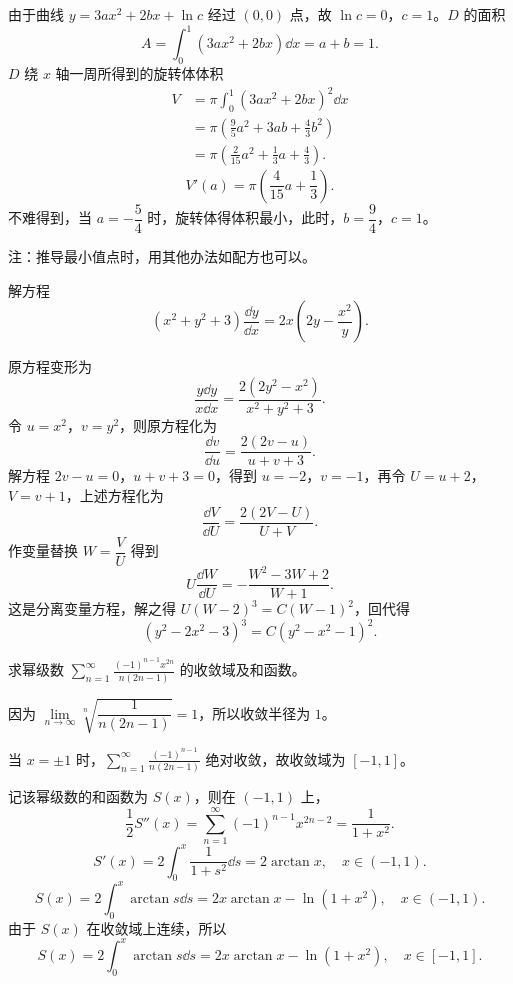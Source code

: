 \begin{solution}
由于曲线 $y=3ax^2+2bx+\ln c$ 经过 $(0,0)$ 点，故 $\ln c=0$，$c=1$。$D$ 的面积
\[ A=\int_0^1(3ax^2+2bx)\dd x=a+b=1. \]
$D$ 绕 $x$ 轴一周所得到的旋转体体积
\begin{align*}
V &= \pi\int_0^1(3ax^2+2bx)^2\dd x\\
&= \pi\left(\frac{9}{5}a^2+3ab+\frac{4}{3}b^2\right)\\
&= \pi\left(\frac{2}{15}a^2+\frac{1}{3}a+\frac{4}{3}\right).
\end{align*}
\[ V'(a)=\pi\left(\frac{4}{15}a+\frac{1}{3}\right). \]
不难得到，当 $a=-\dfrac{5}{4}$ 时，旋转体得体积最小，此时，$b=\dfrac{9}{4}$，$c=1$。

注：推导最小值点时，用其他办法如配方也可以。
\end{solution}

解方程
\[ (x^2+y^2+3)\frac{\dd y}{\dd x}=2x\left(2y-\frac{x^2}{y}\right). \]

\begin{solution}
原方程变形为
\[ \frac{y\dd y}{x\dd x}=\frac{2(2y^2-x^2)}{x^2+y^2+3}. \]
令 $u=x^2$，$v=y^2$，则原方程化为
\[ \frac{\dd v}{\dd u}=\frac{2(2v-u)}{u+v+3}. \]
解方程 $2v-u=0$，$u+v+3=0$，得到 $u=-2$，$v=-1$，再令 $U=u+2$，$V=v+1$，上述方程化为
\[ \frac{\dd V}{\dd U}=\frac{2(2V-U)}{U+V}. \]
作变量替换 $W=\dfrac{V}{U}$ 得到
\[ U\frac{\dd W}{\dd U}=-\frac{W^2-3W+2}{W+1}. \]
这是分离变量方程，解之得 $U(W-2)^3=C(W-1)^2$，回代得
\[ (y^2-2x^2-3)^3=C(y^2-x^2-1)^2. \]
\end{solution}

求幂级数 $\displaystyle\sum_{n=1}^{\infty}\frac{(-1)^{n-1}x^{2n}}{n(2n-1)}$ 的收敛域及和函数。

\begin{solution}
因为 $\lim\limits_{n\to\infty}\sqrt[n]{\dfrac{1}{n(2n-1)}}=1$，所以收敛半径为 $1$。

当 $x=\pm1$ 时，$\displaystyle\sum_{n=1}^{\infty}\frac{(-1)^{n-1}}{n(2n-1)}$ 绝对收敛，故收敛域为 $[-1,1]$。

记该幂级数的和函数为 $S(x)$，则在 $(-1,1)$ 上，
\[ \frac{1}{2}S''(x)=\sum_{n=1}^{\infty}(-1)^{n-1}x^{2n-2}=\frac{1}{1+x^2}. \]
\[ S'(x)=2\int_0^x\frac{1}{1+s^2}\dd s=2\arctan x,\quad x\in(-1,1). \]
\[ S(x)=2\int_0^x\arctan s\dd s=2x\arctan x-\ln(1+x^2),\quad x\in(-1,1). \]
由于 $S(x)$ 在收敛域上连续，所以
\[ S(x)=2\int_0^x\arctan s\dd s=2x\arctan x-\ln(1+x^2),\quad x\in[-1,1]. \]
\end{solution}

